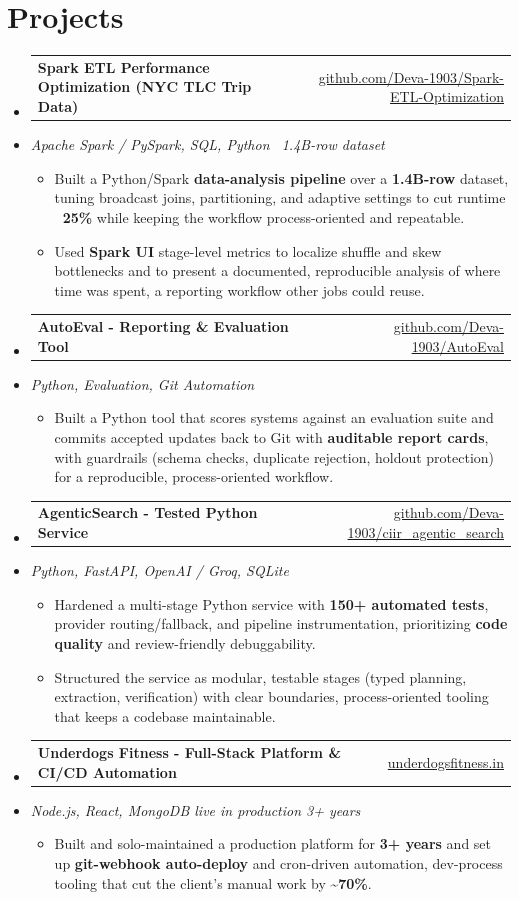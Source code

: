\documentclass[letterpaper,10pt]{article}
\makeatletter
\newcommand{\resumeItem}[1]{
  \item\small{#1\vspace{-1pt}}
}
\newcommand{\resumeProjectHeading}[2]{
    \item
    \begin{tabular*}{0.985\textwidth}[t]{l@{\extracolsep{\fill}}r}
      \small\textbf{#1} & \small #2 \\
    \end{tabular*}\vspace{-5pt}
}
\newcommand{\resumeProjectSubheading}[1]{
  \vspace{-2pt}\item[] {\small\textcolor{ResumeSlate}{\emph{#1}}}\vspace{-3pt}
}
\newcommand{\resumeSubHeadingListStart}{\begin{itemize}[leftmargin=0.0in, label={}, itemsep=2pt, topsep=2pt]}
\newcommand{\resumeSubHeadingListEnd}{\end{itemize}}
\newcommand{\resumeItemListStart}{\begin{itemize}[leftmargin=0.18in, itemsep=2pt, topsep=1pt]}
\newcommand{\resumeItemListEnd}{\end{itemize}\vspace{-4pt}}
\makeatother
\begin{document}
\section{Projects}
\resumeSubHeadingListStart
  \resumeProjectHeading
    {Spark ETL Performance Optimization (NYC TLC Trip Data)}
    {\href{https://github.com/Deva-1903/Spark-ETL-Optimization}{github.com/Deva-1903/Spark-ETL-Optimization}}
  \resumeProjectSubheading{Apache Spark / PySpark, SQL, Python \enspace\textbar\enspace ~1.4B-row dataset}
    \resumeItemListStart
      \resumeItem{Built a Python/Spark \textbf{data-analysis pipeline} over a \textbf{1.4B-row} dataset, tuning broadcast joins, partitioning, and adaptive settings to cut runtime \textbf{~25\%} while keeping the workflow process-oriented and repeatable.}
      \resumeItem{Used \textbf{Spark UI} stage-level metrics to localize shuffle and skew bottlenecks and to present a documented, reproducible analysis of where time was spent, a reporting workflow other jobs could reuse.}
    \resumeItemListEnd
  \resumeProjectHeading
    {AutoEval - Reporting \& Evaluation Tool}
    {\href{https://github.com/Deva-1903/AutoEval}{github.com/Deva-1903/AutoEval}}
  \resumeProjectSubheading{Python, Evaluation, Git Automation}
    \resumeItemListStart
      \resumeItem{Built a Python tool that scores systems against an evaluation suite and commits accepted updates back to Git with \textbf{auditable report cards}, with guardrails (schema checks, duplicate rejection, holdout protection) for a reproducible, process-oriented workflow.}
    \resumeItemListEnd
  \resumeProjectHeading
    {AgenticSearch - Tested Python Service}
    {\href{https://github.com/Deva-1903/ciir_agentic_search}{github.com/Deva-1903/ciir\_agentic\_search}}
  \resumeProjectSubheading{Python, FastAPI, OpenAI / Groq, SQLite}
    \resumeItemListStart
      \resumeItem{Hardened a multi-stage Python service with \textbf{150+ automated tests}, provider routing/fallback, and pipeline instrumentation, prioritizing \textbf{code quality} and review-friendly debuggability.}
      \resumeItem{Structured the service as modular, testable stages (typed planning, extraction, verification) with clear boundaries, process-oriented tooling that keeps a codebase maintainable.}
    \resumeItemListEnd
  \resumeProjectHeading
    {Underdogs Fitness - Full-Stack Platform \& CI/CD Automation}
    {\href{https://www.underdogsfitness.in}{underdogsfitness.in}}
  \resumeProjectSubheading{Node.js, React, MongoDB \enspace\textbar\enspace live in production 3+ years}
    \resumeItemListStart
      \resumeItem{Built and solo-maintained a production platform for \textbf{3+ years} and set up \textbf{git-webhook auto-deploy} and cron-driven automation, dev-process tooling that cut the client's manual work by \textbf{\textasciitilde70\%}.}
    \resumeItemListEnd
\resumeSubHeadingListEnd
\vspace{-4pt}
\end{document}
